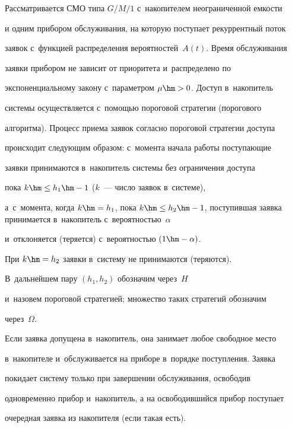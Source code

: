   




  


  Рассматривается СМО типа $G/M/1$ с~накопителем неограниченной емкости 


и одним прибором обслуживания, на которую поступает рекуррентный поток 


заявок с~функцией распределения вероятностей~$A(t)$. Время обслуживания 


заявки прибором не зависит от приоритета и~распределено по 


экспоненциальному закону с~параметром $\mu\hm>0$. Доступ в~накопитель 


системы осуществляется с~помощью пороговой стратегии (порогового 


алгоритма). Процесс приема заявок согласно пороговой стратегии доступа 


происходит следующим образом: с~момента начала работы поступающие 


заявки принимаются в~накопитель системы без ограничения доступа 


пока $k\hm\leq h_1\hm-1$ ($k$~--- чис\-ло заявок в~сис\-те\-ме), 


а~с~момента, когда $k\hm=h_1$, пока $k\hm\leq h_2\hm-


1$, поступившая заявка принимается в~накопитель с~вероятностью~$\alpha$ 


и~отклоняется (теряется) с~вероятностью $(1\hm-\alpha)$. 


При $k\hm=h_2$ заявки в~систему не принимаются (теряются). 


В~дальнейшем пару $(h_1,h_2)$ обозначим через~$H$ 


и~назовем пороговой стратегией; множество таких стратегий обозначим 


через~$\Omega$.


  


  Если заявка допущена в~накопитель, она занимает любое свободное место 


в~накопителе и~обслуживается на приборе в~порядке поступления. Заявка 


покидает систему только при завершении обслуживания, освободив 


одновременно прибор и~накопитель, а на освободившийся прибор поступает 


очередная заявка из накопителя (если такая есть). 


